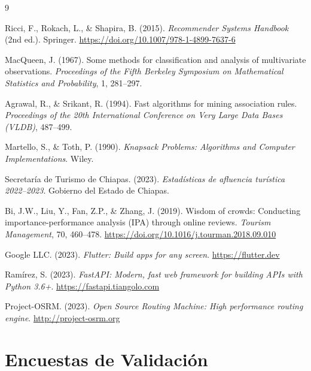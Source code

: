 \documentclass[12pt,letterpaper]{report}
\begin{document}
\begin{thebibliography}{9}

Ricci, F., Rokach, L., \& Shapira, B. (2015).
\textit{Recommender Systems Handbook} (2nd ed.).
Springer. \url{https://doi.org/10.1007/978-1-4899-7637-6}

MacQueen, J. (1967).
Some methods for classification and analysis of multivariate observations.
\textit{Proceedings of the Fifth Berkeley Symposium on Mathematical Statistics and
Probability}, 1, 281–297.

Agrawal, R., \& Srikant, R. (1994).
Fast algorithms for mining association rules.
\textit{Proceedings of the 20th International Conference on Very Large Data Bases (VLDB)},
487–499.

Martello, S., \& Toth, P. (1990).
\textit{Knapsack Problems: Algorithms and Computer Implementations}.
Wiley.

Secretaría de Turismo de Chiapas. (2023).
\textit{Estadísticas de afluencia turística 2022–2023}.
Gobierno del Estado de Chiapas.

Bi, J.W., Liu, Y., Fan, Z.P., \& Zhang, J. (2019).
Wisdom of crowds: Conducting importance-performance analysis (IPA) through online reviews.
\textit{Tourism Management}, 70, 460–478.
\url{https://doi.org/10.1016/j.tourman.2018.09.010}

Google LLC. (2023).
\textit{Flutter: Build apps for any screen}.
\url{https://flutter.dev}

Ramírez, S. (2023).
\textit{FastAPI: Modern, fast web framework for building APIs with Python 3.6+}.
\url{https://fastapi.tiangolo.com}

Project-OSRM. (2023).
\textit{Open Source Routing Machine: High performance routing engine}.
\url{http://project-osrm.org}

\end{thebibliography}

\appendix
\chapter{Encuestas de Validación}
\label{anx:encuestas}
\end{document}

